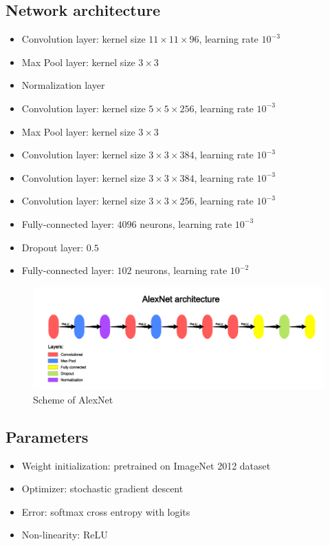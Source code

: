 \documentclass[licencjacka]{pracamgr}
\begin{document}
 		\subsection{Network architecture}
 			\begin{itemize}
 			\item Convolution layer: kernel size $11 \times 11 \times 96$, learning rate $10^{-3}$
 			\item Max Pool layer: kernel size $3 \times 3$
 			\item Normalization layer
 			\item Convolution layer: kernel size $5 \times 5 \times 256$, learning rate $10^{-3}$
 			\item Max Pool layer: kernel size $3 \times 3$
 			\item Convolution layer: kernel size $3 \times 3 \times 384$, learning rate $10^{-3}$
 			\item Convolution layer: kernel size $3 \times 3 \times 384$, learning rate $10^{-3}$
 			\item Convolution layer: kernel size $3 \times 3 \times 256$, learning rate $10^{-3}$
 			\item Fully-connected layer: $4096$ neurons, learning rate $10^{-3}$
 			\item Dropout layer: $0.5$
 			\item Fully-connected layer: $102$ neurons, learning rate $10^{-2}$
 			\end{itemize}
 			\begin{figure}[h]
				\caption{Scheme of AlexNet}
				\centering
				\includegraphics[width=\textwidth]{AlexNet}
			\end{figure}
 		\subsection{Parameters}
 			\begin{itemize}
 			\item Weight initialization: pretrained on ImageNet 2012 dataset
 			\item Optimizer: stochastic gradient descent
 			\item Error: softmax cross entropy with logits
 			\item Non-linearity: ReLU
			\end{itemize}
\end{document}
